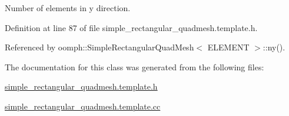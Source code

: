 Number of elements in y direction. 



Definition at line 87 of file simple\+\_\+rectangular\+\_\+quadmesh.\+template.\+h.



Referenced by oomph\+::\+Simple\+Rectangular\+Quad\+Mesh$<$ E\+L\+E\+M\+E\+N\+T $>$\+::ny().



The documentation for this class was generated from the following files\+:\begin{DoxyCompactItemize}
\item 
\hyperlink{simple__rectangular__quadmesh_8template_8h}{simple\+\_\+rectangular\+\_\+quadmesh.\+template.\+h}\item 
\hyperlink{simple__rectangular__quadmesh_8template_8cc}{simple\+\_\+rectangular\+\_\+quadmesh.\+template.\+cc}\end{DoxyCompactItemize}
